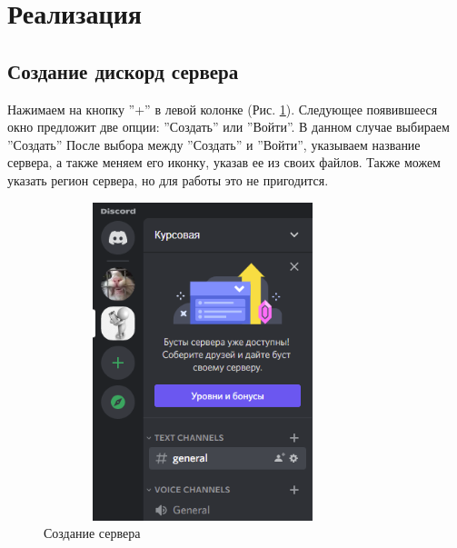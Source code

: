 \documentclass[a4paper,12pt]{article}
\begin{document}
\newpage
\section{Реализация}

\subsection{Создание дискорд сервера }

Нажимаем на кнопку ''+'' в левой колонке ({Рис. \ref{fig:my_label}}).
Следующее появившееся окно предложит две опции: ''Создать'' или ''Войти''. В данном случае выбираем ''Создать'' 
После выбора между ''Создать'' и ''Войти'', указываем название сервера, а также меняем его иконку, указав ее из своих файлов. 
Также можем указать регион сервера, но для работы это не пригодится.
\begin{figure}[b!]
    \centering
    \includegraphics[width = 350px, height=350px]{pictures/Server.png}
    \caption{Создание сервера}
    \label{fig:my_label}
\end{figure}

\newpage
\end{document}
